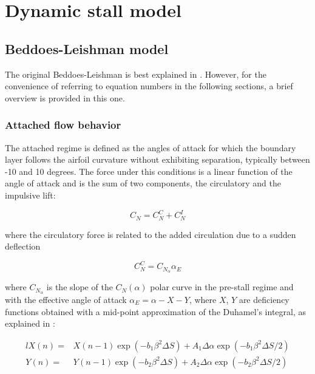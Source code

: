 \section{Dynamic stall model}

\subsection{Beddoes-Leishman model}

The original Beddoes-Leishman is best explained in \autocite{tank_possibility_2017}. However, for the convenience of referring to equation numbers in the following sections, a brief overview is provided in this one. 

\subsubsection{Attached flow behavior}

The attached regime is defined as the angles of attack for which the boundary layer follows the airfoil curvature without exhibiting separation, typically between -10 and 10 degrees. The force under this conditions is a linear function of the angle of attack and is the sum of two components, the circulatory and the impulsive lift: 

\begin{equation}
C_N = C_N^C + C_N^I
\end{equation}

\noindent where the circulatory force is related to the added circulation due to a sudden deflection

\begin{equation}
C_N^C = C_{N_\alpha} \alpha_{E}
\label{eq:circulatory}
\end{equation}

\noindent where $C_{N_\alpha}$ is the slope of the $C_N(\alpha)$ polar curve in the pre-stall regime and with the effective angle of attack $\alpha_E = \alpha - X - Y$, where $X$, $Y$ are deficiency functions obtained with a mid-point approximation of the Duhamel's integral, as explained in \autocite{leishman_principles_2000}:

\begin{eqnarray}{l}
X(n)= & X(n-1) \exp \left(-b_{1} \beta^{2} \Delta S\right)+A_{1} \Delta \alpha \exp \left(-b_{1} \beta^{2} \Delta S / 2\right) \\
Y(n)= & Y(n-1) \exp \left(-b_{2} \beta^{2} \Delta S\right)+A_{2} \Delta \alpha \exp \left(-b_{2} \beta^{2} \Delta S / 2\right)
\end{eqnarray}

